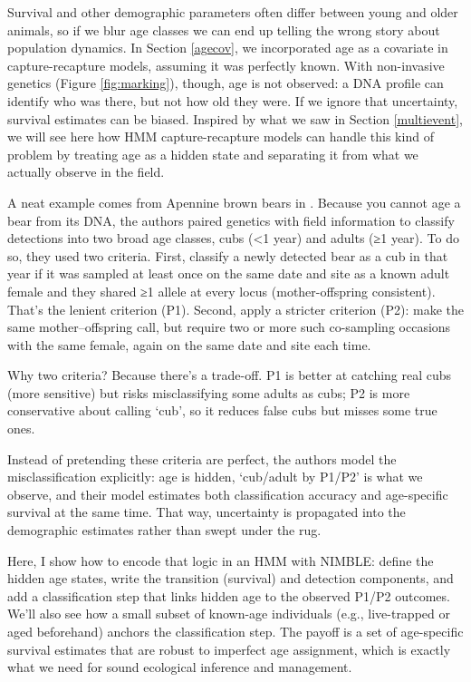 \documentclass[
  12pt,
]{krantz}
\begin{document}
Survival and other demographic parameters often differ between young and older animals, so if we blur age classes we can end up telling the wrong story about population dynamics. In Section \ref{agecov}, we incorporated age as a covariate in capture-recapture models, assuming it was perfectly known. With non-invasive genetics (Figure \ref{fig:marking}), though, age is not observed: a DNA profile can identify who was there, but not how old they were. If we ignore that uncertainty, survival estimates can be biased. Inspired by what we saw in Section \ref{multievent}, we will see here how HMM capture-recapture models can handle this kind of problem by treating age as a hidden state and separating it from what we actually observe in the field.

A neat example comes from Apennine brown bears in \citeauthor{Gervasi2017} \citetext{\citeyear{Gervasi2017}; \citealp[see also][]{gowan2021uncertainty}}. Because you cannot age a bear from its DNA, the authors paired genetics with field information to classify detections into two broad age classes, cubs (\textless1 year) and adults (≥1 year). To do so, they used two criteria. First, classify a newly detected bear as a cub in that year if it was sampled at least once on the same date and site as a known adult female and they shared ≥1 allele at every locus (mother-offspring consistent). That's the lenient criterion (P1). Second, apply a stricter criterion (P2): make the same mother--offspring call, but require two or more such co-sampling occasions with the same female, again on the same date and site each time.

Why two criteria? Because there's a trade-off. P1 is better at catching real cubs (more sensitive) but risks misclassifying some adults as cubs; P2 is more conservative about calling `cub', so it reduces false cubs but misses some true ones.

Instead of pretending these criteria are perfect, the authors model the misclassification explicitly: age is hidden, `cub/adult by P1/P2' is what we observe, and their model estimates both classification accuracy and age-specific survival at the same time. That way, uncertainty is propagated into the demographic estimates rather than swept under the rug.

Here, I show how to encode that logic in an HMM with NIMBLE: define the hidden age states, write the transition (survival) and detection components, and add a classification step that links hidden age to the observed P1/P2 outcomes. We'll also see how a small subset of known-age individuals (e.g., live-trapped or aged beforehand) anchors the classification step. The payoff is a set of age-specific survival estimates that are robust to imperfect age assignment, which is exactly what we need for sound ecological inference and management.
\end{document}
